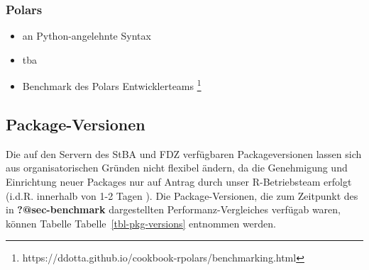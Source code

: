 \documentclass[
  german,
  10pt,
  twoside]{article}
\providecommand{\tightlist}{%
  \setlength{\itemsep}{0pt}\setlength{\parskip}{0pt}}
\let\oldref\ref
\renewcommand{\ref}[1]{\oldref{#1}\raisebox{-0.2ex}{\scriptsize\color{wistaBlue}\ding{247}}}
\begin{document}
\subsubsection{Polars}\label{polars}

\begin{itemize}
\tightlist
\item
  an Python-angelehnte Syntax
\item
  tba
\item
  Benchmark des Polars Entwicklerteams \footnote{https://ddotta.github.io/cookbook-rpolars/benchmarking.html}
\end{itemize}

\subsection{Package-Versionen}\label{package-versionen}

Die auf den Servern des StBA und FDZ verfügbaren Packageversionen lassen
sich aus organisatorischen Gründen nicht flexibel ändern, da die
Genehmigung und Einrichtung neuer Packages nur auf Antrag durch unser
R-Betriebsteam erfolgt (i.d.R. innerhalb von 1-2 Tagen ). Die
Package-Versionen, die zum Zeitpunkt des in \textbf{?@sec-benchmark}
dargestellten Performanz-Vergleiches verfügab waren, können Tabelle
Tabelle~\ref{tbl-pkg-versions} entnommen werden.

\begin{table}

\caption{\label{tbl-pkg-versions}Versionen verfügbarer R-Packages}


\end{table}%


\printbibliography
\end{document}

